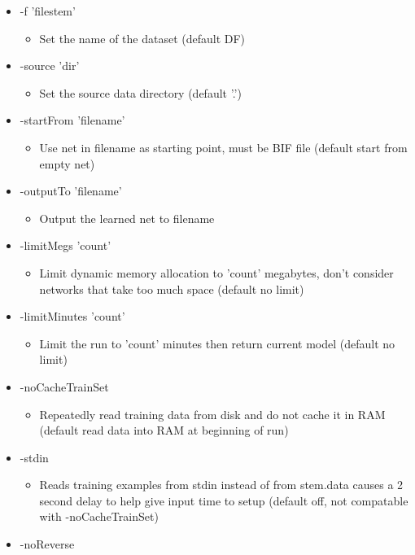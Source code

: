 \begin{itemize}
\item -f 'filestem'\begin{itemize}
\item Set the name of the dataset (default DF)\end{itemize}
\item -source 'dir'\begin{itemize}
\item Set the source data directory (default '.')\end{itemize}
\item -start\-From 'filename'\begin{itemize}
\item Use net in filename as starting point, must be BIF file (default start from empty net)\end{itemize}
\item -output\-To 'filename'\begin{itemize}
\item Output the learned net to filename\end{itemize}
\item -limit\-Megs 'count'\begin{itemize}
\item Limit dynamic memory allocation to 'count' megabytes, don't consider networks that take too much space (default no limit)\end{itemize}
\item -limit\-Minutes 'count'\begin{itemize}
\item Limit the run to 'count' minutes then return current model (default no limit)\end{itemize}
\item -no\-Cache\-Train\-Set\begin{itemize}
\item Repeatedly read training data from disk and do not cache it in RAM (default read data into RAM at beginning of run)\end{itemize}
\item -stdin\begin{itemize}
\item Reads training examples from stdin instead of from stem.data causes a 2 second delay to help give input time to setup (default off, not compatable with -no\-Cache\-Train\-Set)\end{itemize}
\item -no\-Reverse\begin{itemize}

\end{itemize}
\end{itemize}
